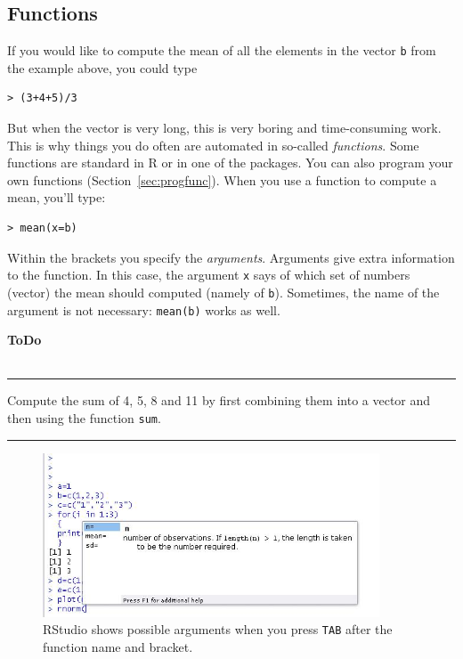 \documentclass[a4paper,11pt,twocolumn,tablecaptionabove]{scrartcl} %
\newenvironment{ToDo} {%
  \begin{flushright}
    \hfill
    \begin{minipage}{0.95\columnwidth}         %
    \textsf{\textbf{ToDo}} \\
      \vspace{-0.85cm}\\
      {\color{Gray}\rule[-0.1cm]{\columnwidth}{1.5pt}}} { %
      {\color{Gray} \rule[0.3cm]{\columnwidth}{1.5pt}}
    \end{minipage}
    \vspace{1em}
  \end{flushright}
  }
\begin{document}
\subsection{Functions}

If you would like to compute the mean of all the elements in the vector \texttt{b} from the example above, you could type 
\begin{Verbatim}[frame=single,gobble=0]
> (3+4+5)/3
\end{Verbatim}
But when the vector is very long, this is very boring and time-consuming work. This is why things you do often are automated in so-called \emph{functions}. Some functions are standard in R or in one of the packages. You can also program your own functions (Section~\ref{sec:progfunc}). When you use a function to compute a mean, you'll type:
\begin{Verbatim}[frame=single,gobble=0]
> mean(x=b)
\end{Verbatim}

Within the brackets you specify the \emph{arguments}. Arguments give extra information to the function. In this case, the argument \texttt{x} says of which set of numbers (vector) the mean should computed (namely of \texttt{b}). Sometimes, the name of the argument is not necessary: \texttt{mean(b)} works as well.

\begin{ToDo}
Compute the sum of 4, 5, 8 and 11 by first combining them into a vector and then using the function \texttt{sum}.\\
\end{ToDo}

\begin{figure}[htb]
  \centering
  \includegraphics[width=10cm, clip=true, trim=0cm 0cm 0cm 1cm]{img/tab_RStudio.jpg}
  \caption{RStudio shows possible arguments when you press \texttt{TAB} after the function name and bracket.}
  \label{fig:tab_RStudio}
\end{figure}
\end{document}
